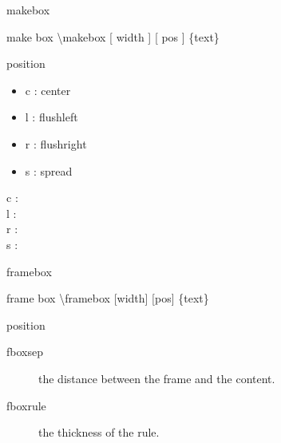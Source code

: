 \documentclass[ aspectratio=149,  10pt,blue,xcolor=pdftex,dvipsnames,table,handout,notes]{beamer}
\begin{document}
		\begin{frame}[t]{makebox}


			\begin{block} {make box}
			\textbackslash makebox [ width ] [ pos ] \{text\}
			\end{block}


			\begin{block} {position}
				\begin{itemize}
				\item	c : center
				\item	l : flushleft
				\item	r : flushright
				\item	s : spread
				\end{itemize}
			\end{block}

			\begin{example}
			c : \\
			l : \\
			r : \\
			s : \\
			\end{example}


		\note[item]{}
		\end{frame}


		\begin{frame}[t]{framebox}



			\begin{block} {frame box}
			\textbackslash framebox [width] [pos] \{text\}
			\end{block}

			\begin{block} {position}
				\begin{description}
				\item	[fboxsep]  the distance between the frame and the content.
				\item	[fboxrule] the thickness of the rule.
				\end{description}
			\end{block}



		\note[item]{}
		\end{frame}
\end{document}
